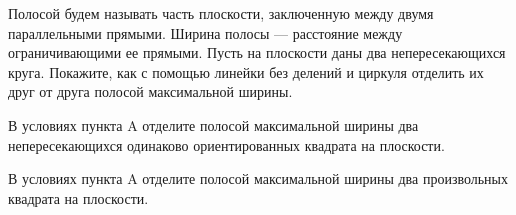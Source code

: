 ﻿
\begin{enumerate}

\itA Полосой будем называть часть плоскости, заключенную между двумя параллельными прямыми. Ширина полосы — расстояние между ограничивающими ее прямыми. Пусть на плоскости даны два непересекающихся круга. Покажите, как с помощью линейки без делений и циркуля отделить их друг от друга полосой максимальной ширины.

\itB В условиях пункта A отделите полосой максимальной ширины два непересекающихся одинаково ориентированных квадрата на плоскости.

\itC В условиях пункта A отделите полосой максимальной ширины два произвольных квадрата на плоскости.
\end{enumerate}